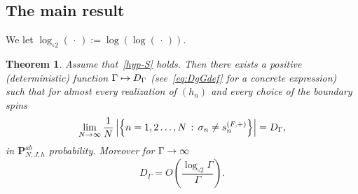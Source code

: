 \documentclass[10pt]{amsart}
\newtheorem{theo}{Theorem}[section]
\theoremstyle{definition}\newtheorem{defi}[theo]{Definition}\newtheorem{rema}[theo]{Remark}\newtheorem{exam}[theo]{Example}\newtheorem{exem}[theo]{Example}\newtheorem{nota}[theo]{Notation}
\newcommand{\bP}{\mathbf{P}}
\newcommand{\gG}{\Gamma}
\newcommand{\gs}{\sigma}
\newcommand{\loglog}{\log_{\circ 2}}
\renewcommand*{\to}{\mathchoice{\longrightarrow}{\rightarrow}{\rightarrow}{\rightarrow}}
\let\oldmapsto\mapsto
\renewcommand*{\mapsto}{\mathchoice{\longmapsto}{\oldmapsto}{\oldmapsto}{\oldmapsto}}
\begin{document}
\subsection{The main result}\label{sec:main}
We let $\loglog(\,\cdot\,):= \log(\log(\,\cdot\,))$.



\begin{theo}\label{th:main}
Assume that~\eqref{hyp-S} holds. Then there exists a positive (deterministic) function $\gG \mapsto D_\gG$ (see~\eqref{eq:DgGdef} for a concrete expression) such that for almost every realization of $(h_n)$ and every choice of the boundary spins
\begin{equation}\label{eq:main1}
\lim_{N \to \infty} \frac 1N \left| \left\{ n=1,2 \dots, N\,:\, \gs_n \neq s^{(F, +)}_n\right\} \right| = D_\gG,
\end{equation}
in $\bP^{ab}_{N, J, h}$ probability. Moreover for $\gG \to \infty$
\begin{equation}\label{eq:main2}
D_\gG = O \left(\frac{\loglog \gG }\gG\right).
\end{equation}
\end{theo}
\end{document}
